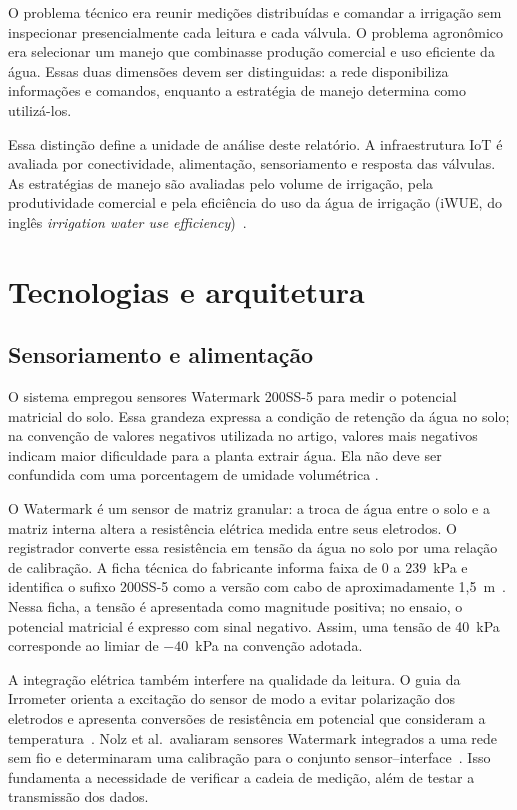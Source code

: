 \documentclass[11pt,a4paper]{article}
\begin{document}
O problema técnico era reunir medições distribuídas e comandar a irrigação sem inspecionar presencialmente cada leitura e cada válvula. O problema agronômico era selecionar um manejo que combinasse produção comercial e uso eficiente da água. Essas duas dimensões devem ser distinguidas: a rede disponibiliza informações e comandos, enquanto a estratégia de manejo determina como utilizá-los.

Essa distinção define a unidade de análise deste relatório. A infraestrutura IoT é avaliada por conectividade, alimentação, sensoriamento e resposta das válvulas. As estratégias de manejo são avaliadas pelo volume de irrigação, pela produtividade comercial e pela eficiência do uso da água de irrigação (iWUE, do inglês \textit{irrigation water use efficiency})~\cite{zhang2022}.

\section{Tecnologias e arquitetura}
\subsection{Sensoriamento e alimentação}
O sistema empregou sensores Watermark 200SS-5 para medir o potencial matricial do solo. Essa grandeza expressa a condição de retenção da água no solo; na convenção de valores negativos utilizada no artigo, valores mais negativos indicam maior dificuldade para a planta extrair água. Ela não deve ser confundida com uma porcentagem de umidade volumétrica \cite{zhang2022}.

O Watermark é um sensor de matriz granular: a troca de água entre o solo e a matriz interna altera a resistência elétrica medida entre seus eletrodos. O registrador converte essa resistência em tensão da água no solo por uma relação de calibração. A ficha técnica do fabricante informa faixa de 0 a 239~kPa e identifica o sufixo 200SS-5 como a versão com cabo de aproximadamente 1,5~m~\cite{irrometer200ss}. Nessa ficha, a tensão é apresentada como magnitude positiva; no ensaio, o potencial matricial é expresso com sinal negativo. Assim, uma tensão de 40~kPa corresponde ao limiar de $-40$~kPa na convenção adotada.

A integração elétrica também interfere na qualidade da leitura. O guia da Irrometer orienta a excitação do sensor de modo a evitar polarização dos eletrodos e apresenta conversões de resistência em potencial que consideram a temperatura~\cite{irrometerintegracao}. Nolz et al.\ avaliaram sensores Watermark integrados a uma rede sem fio e determinaram uma calibração para o conjunto sensor--interface~\cite{nolz2013}. Isso fundamenta a necessidade de verificar a cadeia de medição, além de testar a transmissão dos dados.
\end{document}
